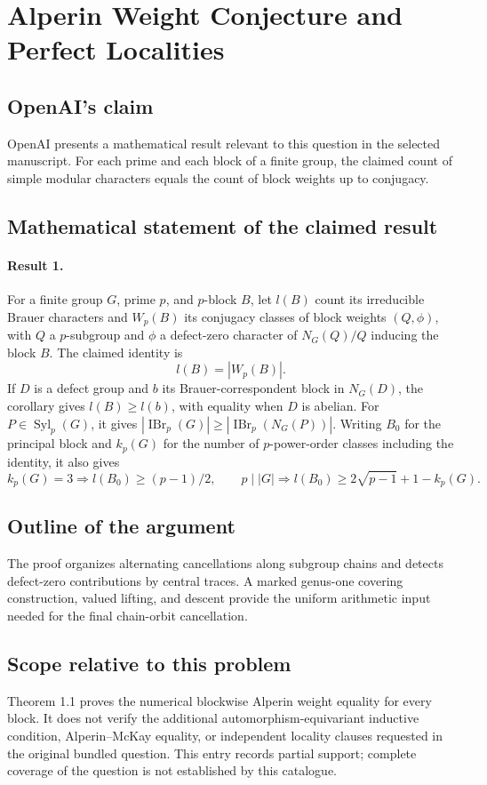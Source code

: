 \documentclass[11pt]{article}
\begin{document}
\section*{Alperin Weight Conjecture and Perfect Localities}

\subsection{OpenAI's claim}
OpenAI presents a mathematical result relevant to this question in the selected manuscript. For each prime and each block of a finite group, the claimed count of simple modular characters equals the count of block weights up to conjugacy.

\subsection{Mathematical statement of the claimed result}
\paragraph{Result 1.} For a finite group \(G\), prime \(p\), and \(p\)-block \(B\), let \(l(B)\) count its irreducible Brauer characters and \(W_p(B)\) its conjugacy classes of block weights \((Q,\phi)\), with \(Q\) a \(p\)-subgroup and \(\phi\) a defect-zero character of \(N_G(Q)/Q\) inducing the block \(B\). The claimed identity is
\[
 l(B)=|W_p(B)|.
\]
If \(D\) is a defect group and \(b\) its Brauer-correspondent block in \(N_G(D)\), the corollary gives \(l(B)\ge l(b)\), with equality when \(D\) is abelian. For \(P\in\operatorname{Syl}_p(G)\), it gives \(|\operatorname{IBr}_p(G)|\ge|\operatorname{IBr}_p(N_G(P))|\). Writing \(B_0\) for the principal block and \(k_p(G)\) for the number of \(p\)-power-order classes including the identity, it also gives
\[
 k_p(G)=3\Rightarrow l(B_0)\ge(p-1)/2,\qquad
 p\mid|G|\Rightarrow l(B_0)\ge2\sqrt{p-1}+1-k_p(G).
\]

\subsection{Outline of the argument}
The proof organizes alternating cancellations along subgroup chains and detects defect-zero contributions by central traces. A marked genus-one covering construction, valued lifting, and descent provide the uniform arithmetic input needed for the final chain-orbit cancellation.

\subsection{Scope relative to this problem}
Theorem 1.1 proves the numerical blockwise Alperin weight equality for every block. It does not verify the additional automorphism-equivariant inductive condition, Alperin–McKay equality, or independent locality clauses requested in the original bundled question. This entry records partial support; complete coverage of the question is not established by this catalogue.
\end{document}
